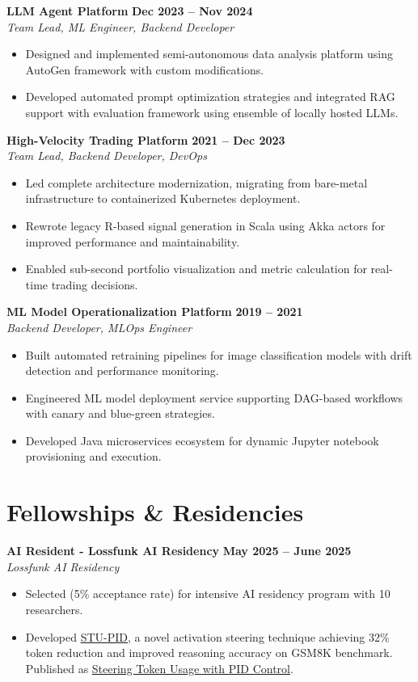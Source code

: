 \documentclass[11pt]{article}
\begin{document}
\textbf{LLM Agent Platform} \hfill \textbf{Dec 2023 -- Nov 2024} \\
\textit{Team Lead, ML Engineer, Backend Developer}
\begin{itemize}[leftmargin=*, nosep]
\item Designed and implemented semi-autonomous data analysis platform using AutoGen framework with custom modifications.
\item Developed automated prompt optimization strategies and integrated RAG support with evaluation framework using ensemble of locally hosted LLMs.
\end{itemize}

\textbf{High-Velocity Trading Platform} \hfill \textbf{2021 -- Dec 2023} \\
\textit{Team Lead, Backend Developer, DevOps}
\begin{itemize}[leftmargin=*, nosep]
\item Led complete architecture modernization, migrating from bare-metal infrastructure to containerized Kubernetes deployment.
\item Rewrote legacy R-based signal generation in Scala using Akka actors for improved performance and maintainability.
\item Enabled sub-second portfolio visualization and metric calculation for real-time trading decisions.
\end{itemize}

\textbf{ML Model Operationalization Platform} \hfill \textbf{2019 -- 2021} \\
\textit{Backend Developer, MLOps Engineer}
\begin{itemize}[leftmargin=*, nosep]
\item Built automated retraining pipelines for image classification models with drift detection and performance monitoring.
\item Engineered ML model deployment service supporting DAG-based workflows with canary and blue-green strategies.
\item Developed Java microservices ecosystem for dynamic Jupyter notebook provisioning and execution.
\end{itemize}

\section{Fellowships \& Residencies}

\textbf{AI Resident - Lossfunk AI Residency} \hfill \textbf{May 2025 -- June 2025} \\
\textit{Lossfunk AI Residency}
\begin{itemize}[leftmargin=*, nosep]
\item Selected (5\% acceptance rate) for intensive AI residency program with 10 researchers.
\item Developed \href{https://github.com/arambharadwaj/STU-PID}{STU-PID}, a novel activation steering technique achieving 32\% token reduction and improved reasoning accuracy on GSM8K benchmark. Published as \href{https://arxiv.org/abs/2506.18831}{Steering Token Usage with PID Control}.
\end{itemize}
\end{document}
